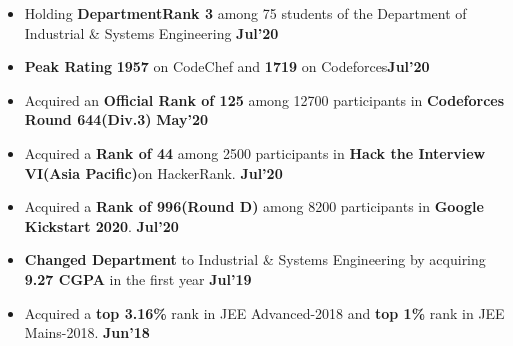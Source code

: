 \documentclass[10pt]{article}
\begin{document}
\vspace{-0.5ex}
\spacedhrule{0.15ex}{1.0ex}
\begin{itemize}[leftmargin=*]
\item Holding \textbf{DepartmentRank 3} among 75 students of the Department of Industrial \& Systems Engineering {\hfill}\textbf{Jul'20}\\[-1.8em]
\item \textbf{Peak Rating} \textbf{1957} on CodeChef\href{https://www.codechef.com/users/mintu_agarwal}{\hspace{0.5ex}\footnotesize\faMousePointer} and \textbf {1719} on Codeforces\href{https://codeforces.com/profile/madmin2619}{\hspace{0.5ex}\footnotesize\faMousePointer\hspace{0.5ex}}{\hfill}\textbf{Jul'20}\\[-1.8em]
\item Acquired an \textbf{Official Rank of 125} among 12700 participants in \textbf{Codeforces Round 644(Div.3)}
\href{https://codeforces.com/contest/1360/standings/participant/65953755#p65953755} {\hspace{0.5ex}\footnotesize\faMousePointer} {\hfill}\textbf{May'20}\\[-1.8em]
\item Acquired a \textbf{Rank of 44} among 2500 participants in \textbf{Hack the Interview VI(Asia Pacific)}on HackerRank. 
\href{https://www.hackerrank.com/results/hack-the-interview-vi-asia-pacific/madmin2619} {\hspace{0.5ex}\footnotesize\faMousePointer} {\hfill}\textbf{Jul'20}\\[-1.8em]
\item Acquired a \textbf{Rank of 996(Round D)} among 8200 participants in \textbf{Google Kickstart 2020}. 
\iffalse
\href{https://github.com/harsh639/Credentials/tree/master/Competitive\%20Programming} {\hspace{0.5ex}\footnotesize\faMousePointer}\fi {\hfill}\textbf{Jul'20}\\[-1.8em]
\item \textbf{Changed Department} to Industrial \& Systems Engineering by acquiring \textbf{9.27 CGPA} in the first year \iffalse \href{https://github.com/harsh639/Credentials/blob/master/Academics/branch_change.pdf} {\hspace{0.5ex}\footnotesize\faMousePointer}\fi {\hfill}\textbf{Jul'19}\\[-1.8em]
 \item Acquired a \textbf{top 3.16\%} rank in JEE Advanced-2018 and \textbf{top 1\%} rank in JEE Mains-2018. \iffalse \href{https://github.com/harsh639/Credentials/blob/master/Academics/JEE.pdf} {\hspace{0.5ex}\footnotesize\faMousePointer}\fi {\hfill}\textbf{Jun'18}\\[-1.8em]

\end{itemize}
\end{document}
